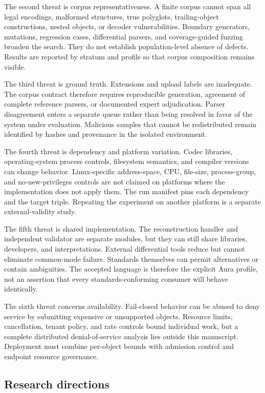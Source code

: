 The second threat is corpus representativeness. A finite corpus cannot span all
legal encodings, malformed structures, true polyglots, trailing-object
constructions, nested objects, or decoder vulnerabilities. Boundary generators,
mutations, regression cases,
differential parsers, and coverage-guided fuzzing broaden the search. They do
not establish population-level absence of defects. Results are reported by
stratum and profile so that corpus composition remains visible.

The third threat is ground truth. Extensions and upload labels are inadequate.
The corpus contract therefore requires reproducible generation, agreement of
complete reference parsers, or documented expert adjudication. Parser
disagreement enters a separate queue rather than being resolved in favor of the
system under evaluation. Malicious samples that cannot be redistributed remain
identified by hashes and provenance in the isolated environment.

The fourth threat is dependency and platform variation. Codec libraries,
operating-system process controls, filesystem semantics, and compiler versions
can change behavior. Linux-specific address-space, CPU, file-size, process-group,
and no-new-privileges controls are not claimed on platforms where the
implementation does not apply them. The run manifest pins each dependency and
the target triple. Repeating the experiment on another platform is a separate
external-validity study.

The fifth threat is shared implementation. The reconstruction handler and
independent validator are separate modules, but they can still share libraries,
developers, and interpretations. External differential tools reduce but cannot
eliminate common-mode failure. Standards themselves can permit alternatives or
contain ambiguities. The accepted language is therefore the explicit Aura
profile, not an assertion that every standards-conforming consumer will behave
identically.

The sixth threat concerns availability. Fail-closed behavior can be abused to
deny service by submitting expensive or unsupported objects. Resource limits,
cancellation, tenant policy, and rate controls bound individual work, but a
complete distributed denial-of-service analysis lies outside this manuscript.
Deployment must combine per-object bounds with admission control and endpoint
resource governance.

\subsection{Research directions}

